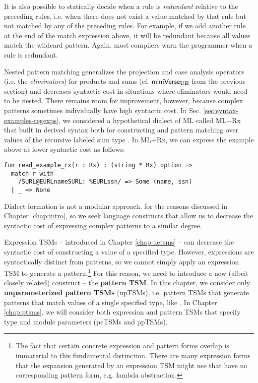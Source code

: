 It is also possible to statically decide when a rule is \emph{redundant} relative to the preceding rules, i.e. when there does not exist a value matched by that rule but not matched by any of the preceding rules. For example, if we add  another rule at the end of the match expression above, it will be redundant because all values match the wildcard pattern. Again, most compilers warn the programmer when a rule is redundant.

Nested pattern matching generalizes the projection and case analysis operators (i.e. the \emph{eliminators}) for products and sums (cf. $\mathsf{miniVerse}_\textbf{UE}$ from the previous section) and decreases syntactic cost in situations where eliminators would need to be nested. There remains room for improvement, however, because complex patterns sometimes    individually have high syntactic cost. In Sec. \ref{sec:syntax-examples-regexps}, we considered a hypothetical dialect of ML called ML+Rx that built in derived syntax both for constructing and pattern matching over values of the recursive labeled sum type . In ML+Rx, we can express the example above at lower syntactic cost as follows:

\begin{lstlisting}
fun read_example_rx(r : Rx) : (string * Rx) option => 
  match r with 
    /SURL@EURLnameSURL: %EURLssn/ => Some (name, ssn)
  | _ => None\end{lstlisting}
\noindent
Dialect formation is not a modular approach, for the reasons discussed in Chapter \ref{chap:intro}, so we seek language constructs that allow us to decrease the syntactic cost of expressing complex patterns to a similar degree.

Expression TSMs -- introduced in Chapter \ref{chap:uetsms} -- can decrease the syntactic cost of constructing a value of a specified type. However, expressions are syntactically distinct from patterns, so we cannot simply apply an expression TSM to generate a pattern.\footnote{The fact that certain concrete expression and pattern forms overlap is immaterial to this fundamental distinction. There are many expression forms that the expansion generated by an expression TSM might use that have no corresponding pattern form, e.g.  lambda abstraction.} %
For this reason, we need to introduce a new (albeit closely related) construct -- the \textbf{pattern TSM}. In this chapter, we consider only \textbf{unparameterized pattern TSMs} (upTSMs), i.e. pattern TSMs that generate patterns that match values of a single specified type, like . In Chapter \ref{chap:ptsms}, we will consider both expression and pattern TSMs that specify type and module parameters (peTSMs and ppTSMs). 

